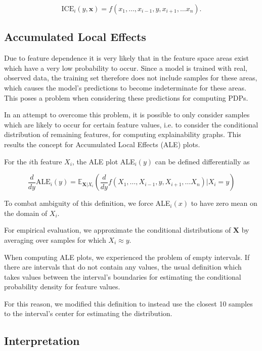 \documentclass[sigconf,nonacm]{acmart}
\begin{document}
\begin{equation}
\text{ICE}_i(y, \boldsymbol x) = f(x_1,\ldots,x_{i-1},y,x_{i+1},\ldots x_n).
\end{equation}

\subsection{Accumulated Local Effects}
Due to feature dependence it is very likely that in the feature space areas exist which have a very low probability to occur. Since a model is trained with real, observed data, the training set therefore does not include samples for these areas, which causes the model's predictions to become indeterminate for these areas. This poses a problem when considering these predictions for computing PDPs. 

In an attempt to overcome this problem, it is possible to only consider samples which are likely to occur for certain feature values, i.e. to consider the conditional distribution of remaining features, for computing explainability graphs. This results the concept for Accumulated Local Effects (ALE) plots. 

For the $i$th feature $X_i$, the ALE plot ALE$_i(y)$ can be defined differentially as



\begin{equation}
\frac{d}{dy} \text{ALE}_i (y) = \mathbb E_{\boldsymbol X | X_i}\left(\frac{d}{dy} f(X_1,\ldots,X_{i-1},y,X_{i+1},\ldots X_n) | X_i=y\right)
\end{equation}

To combat ambiguity of this definition, we force ALE$_i(x)$ to have zero mean on the domain of $X_i$.

For empirical evaluation, we approximate the conditional distributions of $\boldsymbol X$ by averaging over samples for which $X_i \approx y$. 

When computing ALE plots, we experienced the problem of empty intervals. If there are intervals  that do not contain any values, the usual definition which takes values between the interval's boundaries for estimating the conditional probability density for feature values. 

For this reason, we modified this definition to instead use the closest 10 samples to the interval's center for estimating the distribution.

\subsection{Interpretation}
\end{document}
